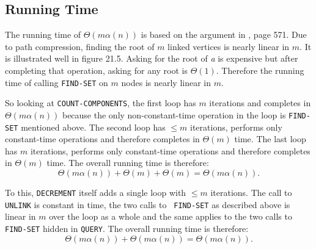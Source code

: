 \documentclass[paper=a4, fleqn]{article}
\newcommand{\clrs}{\textsmaller{CLRS}\xspace}
\begin{document}
\subsection*{Running Time}

The running time of $\Theta(m\alpha(n))$ is based on the argument in \clrs, page
571. Due to path compression, finding the root of $m$ linked vertices is nearly
linear in $m$. It is illustrated well in figure 21.5. Asking for the root of
{\em a} is expensive but after completing that operation, asking for any root is
$\Theta(1)$. Therefore the running time of calling {\tt FIND-SET} on $m$ nodes
is nearly linear in $m$.

So looking at {\tt COUNT-COMPONENTS}, the first loop has $m$ iterations and
completes in $\Theta(m\alpha(n))$ because the only non-constant-time operation
in the loop is {\tt FIND-SET} mentioned above. The second loop has $\leq m$
iterations, performs only constant-time operations and therefore completes in
$\Theta(m)$ time. The last loop has $m$ iterations, performs only constant-time
operations and therefore completes in $\Theta(m)$ time. The overall running time
is therefore:
\[
\Theta(m\alpha(n))+\Theta(m)+\Theta(m)=\Theta(m\alpha(n)).
\]

\noindent To this, {\tt DECREMENT} itself adds a single loop with $\leq m$
iterations. The call to {\tt UNLINK} is constant in time, the two calls to {\tt
  FIND-SET} as described above is linear in $m$ over the loop as a whole and the
same applies to the two calls to {\tt FIND-SET} hidden in {\tt QUERY}. The
overall running time is therefore:
\[
\Theta(m\alpha(n))+\Theta(m\alpha(n))=\Theta(m\alpha(n)).
\]
\end{document}
